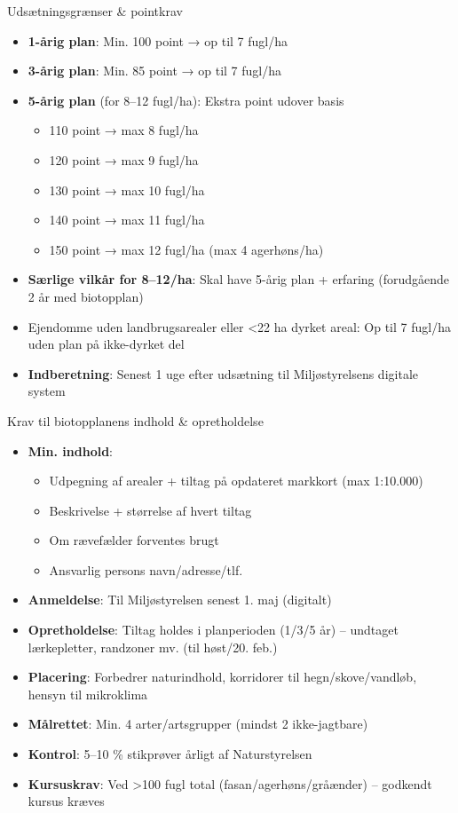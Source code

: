 \begin{frame}{Udsætningsgrænser \& pointkrav}
  \begin{itemize}
    \item \textbf{1-årig plan}: Min. 100 point → op til 7 fugl/ha
    \item \textbf{3-årig plan}: Min. 85 point → op til 7 fugl/ha
    \item \textbf{5-årig plan} (for 8–12 fugl/ha): Ekstra point udover basis
      \begin{itemize}
        \item 110 point → max 8 fugl/ha
        \item 120 point → max 9 fugl/ha
        \item 130 point → max 10 fugl/ha
        \item 140 point → max 11 fugl/ha
        \item 150 point → max 12 fugl/ha (max 4 agerhøns/ha)
      \end{itemize}
    \item \textbf{Særlige vilkår for 8–12/ha}: Skal have 5-årig plan + erfaring (forudgående 2 år med biotopplan)
    \item Ejendomme uden landbrugsarealer eller <22 ha dyrket areal: Op til 7 fugl/ha uden plan på ikke-dyrket del
    \item \textbf{Indberetning}: Senest 1 uge efter udsætning til Miljøstyrelsens digitale system
  \end{itemize}
\end{frame}

\begin{frame}{Krav til biotopplanens indhold \& opretholdelse}
  \begin{itemize}
    \item \textbf{Min. indhold}:
      \begin{itemize}
        \item Udpegning af arealer + tiltag på opdateret markkort (max 1:10.000)
        \item Beskrivelse + størrelse af hvert tiltag
        \item Om rævefælder forventes brugt
        \item Ansvarlig persons navn/adresse/tlf.
      \end{itemize}
    \item \textbf{Anmeldelse}: Til Miljøstyrelsen senest 1. maj (digitalt)
    \item \textbf{Opretholdelse}: Tiltag holdes i planperioden (1/3/5 år) – undtaget lærkepletter, randzoner mv. (til høst/20. feb.)
    \item \textbf{Placering}: Forbedrer naturindhold, korridorer til hegn/skove/vandløb, hensyn til mikroklima
    \item \textbf{Målrettet}: Min. 4 arter/artsgrupper (mindst 2 ikke-jagtbare)
    \item \textbf{Kontrol}: 5–10 \% stikprøver årligt af Naturstyrelsen
    \item \textbf{Kursuskrav}: Ved >100 fugl total (fasan/agerhøns/gråænder) – godkendt kursus kræves
  \end{itemize}
\end{frame}

